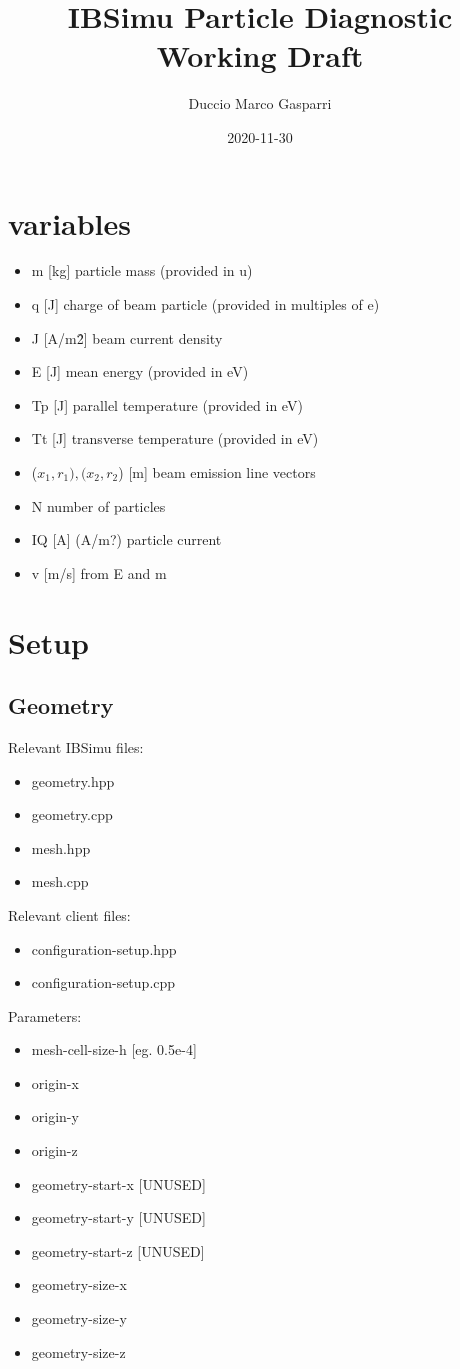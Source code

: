 \documentclass[12pt,a4paper]{article}
\title{IBSimu Particle Diagnostic \\
	\large Working Draft}
\date{2020-11-30}
\author{Duccio Marco Gasparri}
\begin{document}
  \maketitle
  
\section{variables}
\begin{itemize}
	\item m [kg] particle mass (provided in u)
	\item q [J] charge of beam particle (provided in multiples of e)
	\item J [A/m\^2] beam current density
	\item E [J]  mean energy (provided in eV)
	\item Tp [J] parallel temperature (provided in eV)
	\item Tt [J] transverse temperature (provided in eV)
	\item ($x_{1}, r_{1}), (x_{2}, r_{2}$) [m] beam emission line vectors
	\item N number of particles
	\item IQ [A] (A/m?) particle current
	\item v [m/s] from E and m
\end{itemize}

\section{Setup}
\subsection{Geometry}

Relevant IBSimu files:
\begin{itemize}
	\item geometry.hpp 
	\item geometry.cpp
	\item mesh.hpp
	\item mesh.cpp
\end{itemize}



Relevant client files:
\begin{itemize}
	\item configuration-setup.hpp
	\item configuration-setup.cpp
\end{itemize}


Parameters:
\begin{itemize}
	\item mesh-cell-size-h [eg. 0.5e-4]
	\item origin-x 
	\item origin-y
	\item origin-z
	\item geometry-start-x [UNUSED]
	\item geometry-start-y [UNUSED]
	\item geometry-start-z [UNUSED]
	\item geometry-size-x
	\item geometry-size-y
	\item geometry-size-z
\end{itemize}
\end{document}
